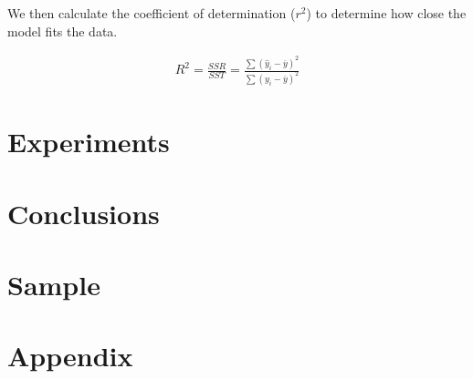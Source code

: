 \documentclass[11pt]{article}
\begin{document}
We then calculate the coefficient of determination ($r^ {2}$) to determine how close the model fits the data.

\begin{align}
R ^ { 2 } = \frac { S S R } { S S T } = \frac { \sum \left( \hat { y } _ { i } - \overline { y } \right) ^ { 2 } } { \sum \left( y _ { i } - \overline { y } \right) ^ { 2 } }
\end{align}

\section{Experiments}\label{section-experiments}

\section{Conclusions}\label{section-conclusions}

\section{Sample}\label{section-sample}

\section{Appendix}\label{section-appendix}





\end{document}
